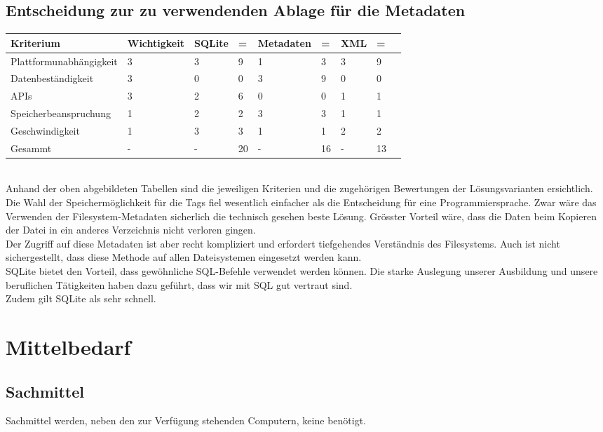 \documentclass[10pt,paper=a4,final]{scrartcl}
\begin{document}
\subsection{Entscheidung zur zu verwendenden Ablage f\"ur die Metadaten}
\begin{tabularx}{\textwidth}{ |l|X|X|l|X|l|X|l|X| }
\hline
Kriterium & Wichtigkeit & SQLite & = & Metadaten & = & XML & = \\ \hline
Plattformunabhängigkeit & 3 & 3 & 9 & 1 & 3 & 3 & 9 \\ \hline
Datenbeständigkeit & 3 & 0 & 0 & 3 & 9 & 0 & 0 \\ \hline
APIs & 3 & 2 & 6 & 0 & 0 & 1 & 1 \\ \hline
Speicherbeanspruchung & 1 & 2 & 2 & 3 & 3 & 1 & 1 \\ \hline
Geschwindigkeit & 1 & 3 & 3 & 1 & 1 & 2 & 2 \\ \hline
Gesammt & - & - & 20 \cellcolor{green!80!}& - & 16 \cellcolor{red!80!}& - & 13 \cellcolor{red!80!} \\ \hline
\end{tabularx}
\\
Anhand der oben abgebildeten Tabellen sind die jeweiligen Kriterien und die zugehörigen Bewertungen der Lösungsvarianten ersichtlich.\\
Die Wahl der Speichermöglichkeit für die Tags fiel wesentlich einfacher als die Entscheidung für eine Programmiersprache. Zwar wäre das Verwenden der Filesystem-Metadaten sicherlich die technisch gesehen beste Lösung. Grösster Vorteil wäre, dass die Daten beim Kopieren der Datei in ein anderes Verzeichnis nicht verloren gingen.\\
Der Zugriff auf diese Metadaten ist aber recht kompliziert und erfordert tiefgehendes Verständnis des Filesystems. Auch ist nicht sichergestellt, dass diese Methode auf allen Dateisystemen eingesetzt werden kann.\\
SQLite bietet den Vorteil, dass gewöhnliche SQL-Befehle verwendet werden können. Die starke Auslegung unserer Ausbildung und unsere beruflichen Tätigkeiten haben dazu geführt, dass wir mit SQL gut vertraut sind.\\
Zudem gilt SQLite als sehr schnell.

\section{Mittelbedarf}
\subsection{Sachmittel}
Sachmittel werden, neben den zur Verfügung stehenden Computern, keine benötigt.
\end{document}
